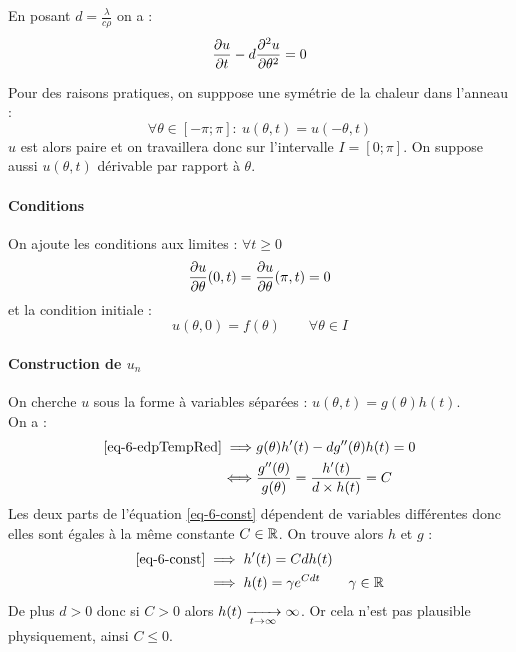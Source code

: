 		En posant $d = \frac{\lambda}{c\rho}$ on a :
		\begin{equation}
			\label{eq-6-edpTempRed}
			\frac{\partial u}{\partial t} - d \frac{\partial^{2} u}{\partial \theta^{2}} = 0
		\end{equation}
		\smallskip

		Pour des raisons pratiques, on supppose une symétrie de la chaleur dans l'anneau :
		$$
			\forall\theta\in[-\pi;\pi] : ~ u(\theta,t) = u(-\theta,t)
		$$
		$u$ est alors paire et on travaillera donc sur l'intervalle $I=[0;\pi]$.
		On suppose aussi $u(\theta,t)$ dérivable par rapport à $\theta$.

	\paragraph{Conditions}
		On ajoute les conditions aux limites : $\forall t \geq 0$
		\begin{equation}
			\label{eq-6-condLimite}
			\frac{\partial u}{\partial \theta}(0,t) = \frac{\partial u}{\partial \theta}(\pi,t) = 0
		\end{equation}
		et la condition initiale :
		\begin{equation}
			\label{eq-6-condIni}
			u(\theta, 0) = f(\theta) \qquad \forall\theta\in I
		\end{equation}

	\paragraph{Construction de \texorpdfstring{$u_n$}{un}}
		On cherche $u$ sous la forme à variables séparées : \quad $u(\theta,t) = g(\theta)h(t)$.\\
		On a :
		\begin{align}
			\notag
			\eqref{eq-6-edpTempRed} \implies& g(\theta)h'(t) - dg''(\theta)h(t) = 0		\\
									\iff& \frac{g''(\theta)}{g(\theta)} = \frac{h'(t)}{d\times h(t)} = C
									\label{eq-6-const}
		\end{align}
		Les deux parts de l'équation \eqref{eq-6-const} dépendent de variables différentes donc elles sont égales à la même constante $C\in\mathbb{R}$.
		On trouve alors $h$ et $g$ :
		\begin{align*}
			\eqref{eq-6-const} 	&\implies h'(t) = Cdh(t)		\\
								&\implies h(t) = \gamma e^{Cdt}	\qquad \gamma \in\mathbb{R}
		\end{align*}
		De plus $d>0$ donc si $C>0$ alors $h(t) \xrightarrow[t \to \infty]{} \infty$. Or cela n'est pas plausible physiquement, ainsi $C\leq0$.


